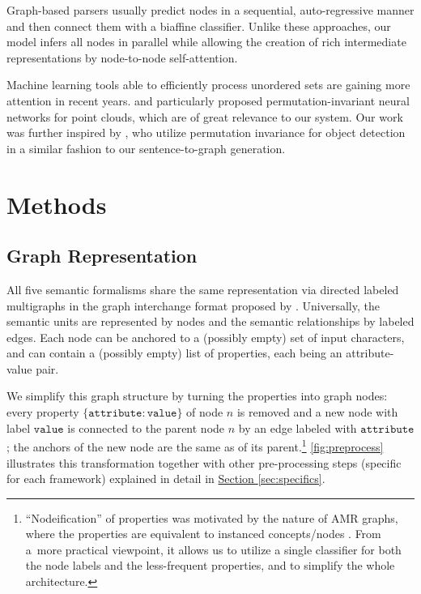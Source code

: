 \documentclass[11pt,a4paper]{article}
\newcommand{\secref}[1]{\hyperref[#1]{Section \ref*{#1}}}
\begin{document}
Graph-based parsers \cite{mcdonald2006online, peng2017addressing, dozat2018simpler, cai-lam-2020-amr} usually predict nodes in a sequential, auto-regressive manner and then connect them with a biaffine classifier. Unlike these approaches, our model infers all nodes in parallel while allowing the creation of rich intermediate representations by node-to-node self-attention.

Machine learning tools able to efficiently process unordered sets are gaining more attention in recent years. \citet{qi2017pointnet} and particularly \citet{zhang2019deep} proposed permutation-invariant neural networks for point clouds, which are of great relevance to our system. Our work was further inspired by \citet{carion2020end}, who utilize permutation invariance for object detection in a similar fashion to our sentence-to-graph generation. \section{Methods}

\subsection{Graph Representation}
\label{sec:representation}

All five semantic formalisms share the same representation via directed labeled multigraphs in the graph interchange format proposed by \citet{kuhlmann2016towards}. Universally, the semantic units are represented by nodes and the semantic relationships by labeled edges. Each node can be anchored to a (possibly empty) set of input characters, and can contain a (possibly empty) list of properties, each being an attribute-value pair.

We simplify this graph structure by turning the properties into graph nodes: every property $\{\texttt{attribute}: \texttt{value}\}$ of node $n$ is removed and a new node with label $\texttt{value}$ is connected to the parent node $n$ by an edge labeled with $\texttt{attribute}$; the anchors of the new node are the same as of its parent.\hspace{-.08em}\footnote{``Nodeification'' of properties was motivated by the nature of AMR graphs, where the properties are equivalent to instanced concepts/nodes \cite{banarescu2013abstract}. From a~more practical viewpoint, it allows us to utilize a single classifier for both the node labels and the less-frequent properties, and to simplify the whole architecture.}  \autoref{fig:preprocess} illustrates this transformation together with other pre-processing steps (specific for each framework) explained in detail in \secref{sec:specifics}.
\end{document}
